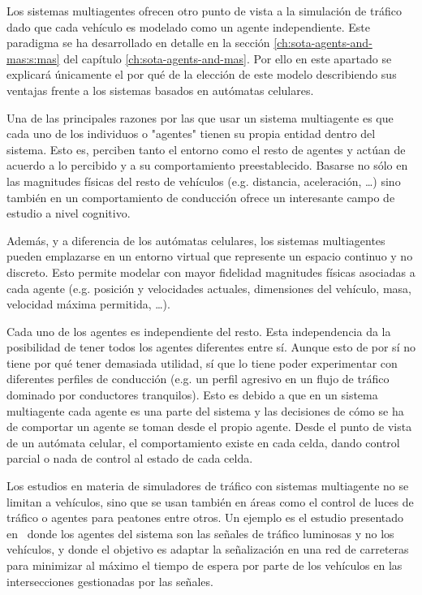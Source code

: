 Los sistemas multiagentes ofrecen otro punto de vista a la simulación de tráfico dado que cada vehículo es modelado como un agente independiente. Este paradigma se ha desarrollado en detalle en la sección \ref{ch:sota-agents-and-mas:s:mas} del capítulo \ref{ch:sota-agents-and-mas}. Por ello en este apartado se explicará únicamente el por qué de la elección de este modelo describiendo sus ventajas frente a los sistemas basados en autómatas celulares.

Una de las principales razones por las que usar un sistema multiagente es que cada uno de los individuos o "agentes" tienen su propia entidad dentro del sistema. Esto es, perciben tanto el entorno como el resto de agentes y actúan de acuerdo a lo percibido y a su comportamiento preestablecido. Basarse no sólo en las magnitudes físicas del resto de vehículos (e.g. distancia, aceleración, \ldots) sino también en un comportamiento de conducción ofrece un interesante campo de estudio a nivel cognitivo.

Además, y a diferencia de los autómatas celulares, los sistemas multiagentes pueden emplazarse en un entorno virtual que represente un espacio continuo y no discreto. Esto permite modelar con mayor fidelidad magnitudes físicas asociadas a cada agente (e.g. posición y velocidades actuales, dimensiones del vehículo, masa, velocidad máxima permitida, \ldots).

Cada uno de los agentes es independiente del resto. Esta independencia da la posibilidad de tener todos los agentes diferentes entre sí. Aunque esto de por sí no tiene por qué tener demasiada utilidad, sí que lo tiene poder experimentar con diferentes perfiles de conducción (e.g. un perfil agresivo en un flujo de tráfico dominado por conductores tranquilos). Esto es debido a que en un sistema multiagente cada agente es una parte del sistema y las decisiones de cómo se ha de comportar un agente se toman desde el propio agente. Desde el punto de vista de un autómata celular, el comportamiento existe en cada celda, dando control parcial o nada de control al estado de cada celda.

Los estudios en materia de simuladores de tráfico con sistemas multiagente no se limitan a vehículos, sino que se usan también en áreas como el control de luces de tráfico o agentes para peatones entre otros. Un ejemplo es el estudio presentado en~\cite{Clymer2002} donde los agentes del sistema son las señales de tráfico luminosas y no los vehículos, y donde el objetivo es adaptar la señalización en una red de carreteras para minimizar al máximo el tiempo de espera por parte de los vehículos en las intersecciones gestionadas por las señales.

